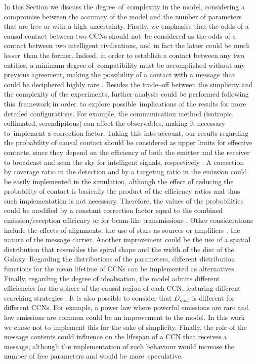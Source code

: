\documentclass[crop]{CSLB}
\newcommand{\ceti}{CCN}
\newcommand{\cetis}{CCNs}
\begin{document}
In this Section we discuss the degree of complexity in the model, considering a compromise between the accuracy of the
model and the number of parameters that are free or with a high uncertainty.
%
Firstly, we emphasise that the odds of a causal contact between two \cetis{} should not be considered as the odds of a
contact between two intelligent civilisations, and in fact the latter could be much lesser than the former.
%
Indeed, in order to establish a contact between any two entities, a minimum degree of compatibility must be accomplished
without any previous agreement, making the possibility of a contact with a message that could be deciphered highly rare
\citep[see e.g. ][]{forgan_collimated_2014}.
%
Besides the trade--off between the simplicity and the complexity of the experiments, further analysis could be performed
following this framework in order to explore possible implications of the results for more detailed configurations.
%
For example, the communication method (isotropic, collimated, serendipitous) can affect the observables, making it
necessary to implement a correction factor.
%
Taking this into account, our results regarding the probability of causal contact should be considered as upper limits
for effective contacts, since they depend on the efficiency of both the emitter and the receiver to broadcast and scan
the sky for intelligent signals, respectively \citep{grimaldi_signal_2017}.
%
A correction by coverage ratio in the detection and by a targeting ratio in the emission could be easily implemented in
the simulation, although the effect of reducing the probability of contact is basically the product of the efficiency
ratios and thus such implementation is not necessary.
%
Therefore, the values of the probabilities could be modified by a constant correction factor equal to the combined
emission/reception efficiency \citep{smith_broadcasting_2009, anchordoqui_upper_2019, forgan_collimated_2014} or for
beam-like transmissions \citep{grimaldi_signal_2017}. 
%
Other considerations include the effects of alignments, the use of stars as sources or amplifiers \citep{Edmondson2003,
borra_searching_2012}, the nature of the message carrier.
%
Another improvement could be the use of a spatial distribution that resembles the spiral shape and the width of the disc
of the Galaxy.
%
Regarding the distributions of the parameters, different distribution functions for the mean lifetime of \cetis{} can be
implemented as alternatives.
%
Finally, regarding the degree of idealisation, the model admits different efficiencies for the sphere of the causal
region of each \ceti{}, featuring different searching strategies \citep{hippke_interstellar_2017}. 
%
It is also possible to consider that $D_{max}$ is different for different \cetis{}.
%
For example, a power law where powerful emissions are rare and low emissions are common could be an improvement to the
model.
%
In this work we chose not to implement this for the sake of simplicity.
%
Finally, the role of the message contents could influence on the lifespan of a \ceti{} that receives a message, although
the implementation of such behaviour would increase the number of free parameters and would be more speculative.     
\end{document}
